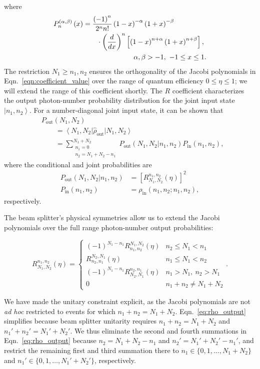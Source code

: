\documentclass[aps,twocolumn,secnumarabic,amsmath,amssymb,pra,groupedaddress,
showpacs, showkeys]{revtex4-1}
\newcommand{\bra}[1]{\left\langle #1 \right|}
\newcommand{\ket}[1]{\left|#1\right\rangle}
\newcommand{\pna}[1]{\left(#1\right)}
\newcommand{\pnb}[1]{\left[#1\right]}
\newcommand{\eqn}[1]{
\begin{equation}
	#1
\end{equation}
}
\begin{document}
where
\begin{align}
P_n^{\pna{\alpha,\beta}}\pna{x} & = \frac{\pna{-1}^n}{2^n
  n!}\pna{1-x}^{-\alpha}\pna{1+x}^{-\beta}\nonumber \\ & \qquad \cdot\pna{\frac{d}{dx}}^n\pnb{\pna{1-x}^{n+\alpha}\pna{1+x}^{n+\beta}},\nonumber \\
& \hspace{1.0in} \alpha,\beta >-1,~-1\leq x \leq 1.
\end{align}
The restriction $N_1\geq n_1, n_2$ ensures the orthogonality of the Jacobi
polynomials in Eqn.~\ref{eqn:coefficient_value} over the range of quantum
efficiency $0\leq \eta \leq 1$; we will extend the range of this coefficient
shortly. The $R$ coefficient characterizes the output photon-number probability
distribution for the joint input state $\ket{n_1,n_2}$. For a number-diagonal
joint input state, it can be shown that
\begin{align}
    & P_{\textrm{out}}\pna{N_1, N_2}  \nonumber \\ 
    & \qquad = \bra{N_1, N_2} \hat{\rho}_{\textrm{out}}\ket{N_1, N_2} \nonumber \\
    & \qquad = \sum_{\substack{n_1=0\\n_2=N_1+N_2-n_1}}^{N_1+N_2}P_{\textrm{out}}\pna{N_1,
      N_2|n_1, n_2} P_{\textrm{in}}\pna{n_1, n_2},
\end{align}
where the conditional and joint probabilities are 
\begin{align}
P_{\textrm{out}}\pna{N_1, N_2|n_1, n_2} & =
\pnb{R_{N_1,N_2}^{n_1,n_2}\pna{\eta}}^2 \nonumber \\
P_{\textrm{in}}\pna{n_1, n_2} & = \rho_{\textrm{in}}\pna{n_1,n_2;n_1,n_2},
\end{align} respectively.

The beam splitter's physical symmetries allow us to extend the Jacobi
polynomials over the full range photon-number output probabilities:
\eqn{
   R_{N_1,N_2}^{n_1,n_2}\pna{\eta} = \left\{
     \begin{array}{lr}
        \pna{-1}^{N_1 - n_1} R_{n_1,n_2}^{N_1,N_2}\pna{\eta} & n_2 \leq N_1 < n_1 \\
       R_{n_2,n_1}^{N_2,N_1}\pna{\eta} & n_1 \leq N_1 < n_2 \\
	   \pna{-1}^{N_1 - n_1} R_{N_2,N_1}^{n_2,n_1}\pna{\eta} & n_1 > N_1,~n_2 > N_1 \\
	0 & n_1+n_2\neq N_1+N_2
     \end{array}
\right..}
We have made the unitary constraint explicit, as the Jacobi polynomials are not
\emph{ad hoc} restricted to events for which
$n_1+n_2=N_1+N_2$. Eqn.~\ref{eq:rho_output} simplifies because beam splitter
unitarity requires $n_1+n_2=N_1+N_2$ and $n_1'+n_2'=N_1'+N_2'$. We thus
eliminate the second and fourth summations in Eqn.~\ref{eq:rho_output} because
$n_2=N_1+N_2-n_1$ and $n_2'=N_1'+N_2'-n_1'$, and restrict the remaining first
and third summation there to $n_1\in\{0,1,\ldots,N_1+N_2\}$ and
$n_1'\in\{0,1,\ldots,N_1'+N_2'\}$, respectively.
\end{document}
